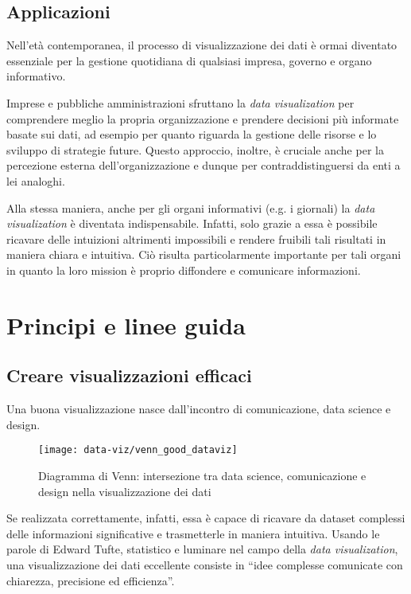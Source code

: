 \subsection{Applicazioni}
Nell'età contemporanea, il processo di visualizzazione dei dati è ormai diventato essenziale per la gestione quotidiana di qualsiasi 
impresa, governo e organo informativo.

Imprese e pubbliche amministrazioni sfruttano la \emph{data visualization} per comprendere meglio la propria organizzazione e 
prendere decisioni più informate basate sui dati, ad esempio per quanto riguarda la gestione delle risorse e lo sviluppo di strategie future. 
Questo approccio, inoltre, è cruciale anche per la percezione esterna dell'organizzazione e dunque per contraddistinguersi da enti a lei analoghi.

Alla stessa maniera, anche per gli organi informativi (e.g. i giornali) la \emph{data visualization} è diventata indispensabile. 
Infatti, solo grazie a essa è possibile ricavare delle intuizioni altrimenti impossibili e rendere fruibili 
tali risultati in maniera chiara e intuitiva. Ciò risulta particolarmente importante per tali organi in quanto la loro mission è proprio diffondere 
e comunicare informazioni.



\section{Principi e linee guida}
\subsection{Creare visualizzazioni efficaci}
Una buona visualizzazione nasce dall'incontro di comunicazione, data science e design.
\begin{figure}[!h] 
    \centering 
    \texttt{[image: data-viz/venn\_good\_dataviz]} 
    \caption{Diagramma di Venn: intersezione tra data science, comunicazione e design nella visualizzazione dei dati}
    \label{fig:venn_good_dataviz}
\end{figure}

\noindent Se realizzata correttamente, infatti, essa è capace di ricavare da dataset complessi delle informazioni significative e trasmetterle in maniera intuitiva.
Usando le parole di Edward Tufte, statistico e luminare nel campo della \emph{data visualization}, una visualizzazione dei dati eccellente consiste in
``idee complesse comunicate con chiarezza, precisione ed efficienza''.

